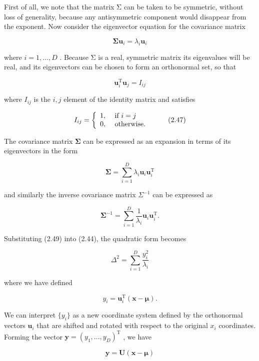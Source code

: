 \documentclass[
  10
]{article}
\begin{document}
First of all, we note that the matrix Σ can be taken to be symmetric,
without loss of generality, because any antisymmetric component would
disappear from the exponent. Now consider the eigenvector equation for
the covariance matrix

\[
\pmb {\Sigma} \mathbf {u} _ {i} = \lambda_ {i} \mathbf {u} _ {i}\tag{2.45}
\]

where \(i = 1 , \ldots , D\) . Because Σ is a real, symmetric matrix its
eigenvalues will be real, and its eigenvectors can be chosen to form an
orthonormal set, so that

\[
\mathbf {u} _ {i} ^ {\mathrm{T}} \mathbf {u} _ {j} = I _ {i j}\tag{2.46}
\]

where \(I _ { i j }\) is the \(i , j\) element of the identity matrix
and satisfies

\[
I _ {i j} = \left\{ \begin{array}{l l} 1, & \text { if   } i = j \\ 0, & \text { otherwise. } \end{array} \right.\tag{2.47}
\]

The covariance matrix \(\pmb { \Sigma }\) can be expressed as an
expansion in terms of its eigenvectors in the form

\[
\pmb {\Sigma} = \sum_ {i = 1} ^ {D} \lambda_ {i} \mathbf {u} _ {i} \mathbf {u} _ {i} ^ {\mathrm{T}}\tag{2.48}
\]

and similarly the inverse covariance matrix \(\Sigma ^ { - 1 }\) can be
expressed as

\[
\boldsymbol {\Sigma} ^ {- 1} = \sum_ {i = 1} ^ {D} \frac {1}{\lambda_ {i}} \mathbf {u} _ {i} \mathbf {u} _ {i} ^ {\mathrm{T}}.\tag{2.49}
\]

Substituting (2.49) into (2.44), the quadratic form becomes

\[
\Delta^ {2} = \sum_ {i = 1} ^ {D} \frac {y _ {i} ^ {2}}{\lambda_ {i}}\tag{2.50}
\]

where we have defined

\[
y _ {i} = \mathbf {u} _ {i} ^ {\mathrm{T}} (\mathbf {x} - \boldsymbol {\mu}).\tag{2.51}
\]

We can interpret \(\{ y _ { i } \}\) as a new coordinate system defined
by the orthonormal vectors \(\mathbf { u } _ { i }\) that are shifted
and rotated with respect to the original \(x _ { i }\) coordinates.
Forming the vector
\(\mathbf { y } = ( y _ { 1 } , \dots , y _ { D } ) ^ { \mathrm { T } }\)
, we have

\[
\mathbf {y} = \mathbf {U} (\mathbf {x} - \boldsymbol {\mu})\tag{2.52}
\]
\end{document}
